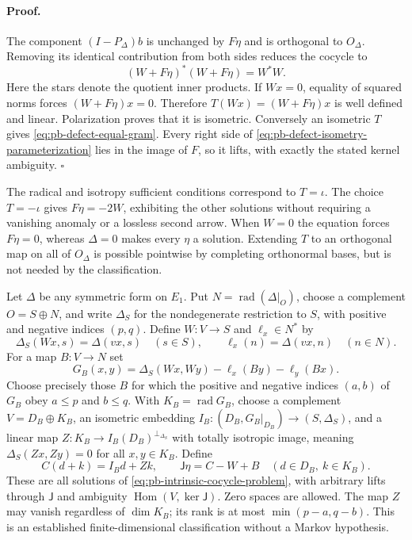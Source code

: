 \paragraph{Proof.}
The component $(I-P_\Delta)b$ is unchanged by $F\eta$ and is orthogonal
to $O_\Delta$. Removing its identical contribution from both sides
reduces the cocycle to
\begin{equation}
(W+F\eta)^*(W+F\eta)=W^*W.
\label{eq:pb-defect-equal-gram}
\end{equation}
Here the stars denote the quotient inner products. If $Wx=0$, equality
of squared norms forces $(W+F\eta)x=0$. Therefore
$T(Wx)=(W+F\eta)x$ is well defined and linear. Polarization proves that
it is isometric. Conversely an isometric $T$ gives
\eqref{eq:pb-defect-equal-gram}. Every right side of
\eqref{eq:pb-defect-isometry-parameterization} lies in the image of $F$,
so it lifts, with exactly the stated kernel ambiguity. $\square$

The radical and isotropy sufficient conditions correspond to $T=\iota$.
The choice $T=-\iota$ gives $F\eta=-2W$, exhibiting the other solutions
without requiring a vanishing anomaly or a lossless second arrow.
When $W=0$ the equation forces $F\eta=0$, whereas $\Delta=0$ makes every
$\eta$ a solution. Extending $T$ to an orthogonal map on all of
$O_\Delta$ is possible pointwise by completing orthonormal bases, but
is not needed by the classification. 

Let $\Delta$ be any symmetric form on $E_1$. Put
$N=\operatorname{rad}(\Delta|_O)$, choose a complement $O=S\oplus N$,
and write $\Delta_S$ for the nondegenerate restriction to $S$, with
positive and negative indices $(p,q)$. Define $W:V\to S$ and
$\ell_x\in N^*$ by
\begin{equation}
\Delta_S(Wx,s)=\Delta(vx,s)\quad(s\in S),\qquad
\ell_x(n)=\Delta(vx,n)\quad(n\in N).
\label{eq:pb-defect-signed-projection}
\end{equation}
For a map $B:V\to N$ set
\begin{equation}
G_B(x,y)=\Delta_S(Wx,Wy)-\ell_x(By)-\ell_y(Bx).
\label{eq:pb-defect-signed-budget}
\end{equation}
Choose precisely those $B$ for which the positive and negative indices
$(a,b)$ of $G_B$ obey $a\leq p$ and $b\leq q$. With
$K_B=\operatorname{rad}G_B$, choose a complement
$V=D_B\oplus K_B$, an isometric embedding
$I_B:(D_B,G_B|_{D_B})\to(S,\Delta_S)$, and a linear map
$Z:K_B\to I_B(D_B)^{\perp_{\Delta_S}}$ with totally isotropic image,
meaning $\Delta_S(Zx,Zy)=0$ for all $x,y\in K_B$. Define
\begin{equation}
C(d+k)=I_Bd+Zk,\qquad
\mathsf J\eta=C-W+B
\quad(d\in D_B,\ k\in K_B).
\label{eq:pb-defect-signed-parameterization}
\end{equation}
These are all solutions of \eqref{eq:pb-intrinsic-cocycle-problem},
with arbitrary lifts through $\mathsf J$ and ambiguity
$\operatorname{Hom}(V,\ker\mathsf J)$. Zero spaces are allowed.
The map $Z$ may vanish regardless of $\dim K_B$; its rank is at most
$\min(p-a,q-b)$. This is an established finite-dimensional classification
without a Markov hypothesis. 

